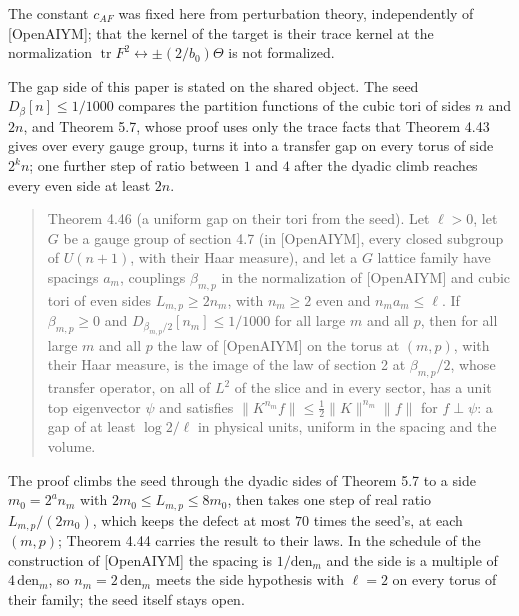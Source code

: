 \documentclass[10pt,letterpaper,twocolumn]{article}
\providecommand{\rm}{}\DeclareOldFontCommand{\rm}{\normalfont\rmfamily}{\mathrm}
\begin{document}
The constant \(c_{\rm AF}\) was fixed here from perturbation theory, independently of {[}OpenAIYM{]}; that the kernel of the target is their trace kernel at the normalization \(\operatorname{tr}F^2\leftrightarrow\pm(2/b_0)\Theta\) is not formalized.

The gap side of this paper is stated on the shared object. The seed \(D_\beta[n]\le1/1000\) compares the partition functions of the cubic tori of sides \(n\) and \(2n\), and Theorem 5.7, whose proof uses only the trace facts that Theorem 4.43 gives over every gauge group, turns it into a transfer gap on every torus of side \(2^kn\); one further step of ratio between \(1\) and \(4\) after the dyadic climb reaches every even side at least \(2n\).

\begin{quote}
Theorem 4.46 (a uniform gap on their tori from the seed). Let \(\ell>0\), let \(G\) be a gauge group of section 4.7 (in {[}OpenAIYM{]}, every closed subgroup of \(U(n+1)\), with their Haar measure), and let a \(G\) lattice family have spacings \(a_m\), couplings \(\beta_{m,p}\) in the normalization of {[}OpenAIYM{]} and cubic tori of even sides \(L_{m,p}\ge2n_m\), with \(n_m\ge2\) even and \(n_ma_m\le\ell\). If \(\beta_{m,p}\ge0\) and \(D_{\beta_{m,p}/2}[n_m]\le1/1000\) for all large \(m\) and all \(p\), then for all large \(m\) and all \(p\) the law of {[}OpenAIYM{]} on the torus at \((m,p)\), with their Haar measure, is the image of the law of section 2 at \(\beta_{m,p}/2\), whose transfer operator, on all of \(L^2\) of the slice and in every sector, has a unit top eigenvector \(\psi\) and satisfies \(\|K^{n_m}f\|\le\tfrac12\|K\|^{n_m}\|f\|\) for \(f\perp\psi\): a gap of at least \(\log2/\ell\) in physical units, uniform in the spacing and the volume.
\end{quote}

The proof climbs the seed through the dyadic sides of Theorem 5.7 to a side \(m_0=2^an_m\) with \(2m_0\le L_{m,p}\le8m_0\), then takes one step of real ratio \(L_{m,p}/(2m_0)\), which keeps the defect at most \(70\) times the seed's, at each \((m,p)\); Theorem 4.44 carries the result to their laws. In the schedule of the construction of {[}OpenAIYM{]} the spacing is \(1/\mathrm{den}_m\) and the side is a multiple of \(4\,\mathrm{den}_m\), so \(n_m=2\,\mathrm{den}_m\) meets the side hypothesis with \(\ell=2\) on every torus of their family; the seed itself stays open.
\end{document}
